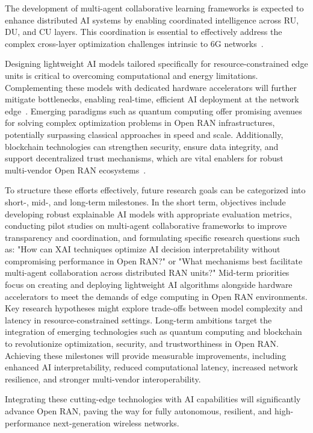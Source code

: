 \documentclass[sigconf]{acmart}
\begin{document}
The development of multi-agent collaborative learning frameworks is expected to enhance distributed AI systems by enabling coordinated intelligence across RU, DU, and CU layers. This coordination is essential to effectively address the complex cross-layer optimization challenges intrinsic to 6G networks~\cite{ref48}.

Designing lightweight AI models tailored specifically for resource-constrained edge units is critical to overcoming computational and energy limitations. Complementing these models with dedicated hardware accelerators will further mitigate bottlenecks, enabling real-time, efficient AI deployment at the network edge~\cite{ref50}. Emerging paradigms such as quantum computing offer promising avenues for solving complex optimization problems in Open RAN infrastructures, potentially surpassing classical approaches in speed and scale. Additionally, blockchain technologies can strengthen security, ensure data integrity, and support decentralized trust mechanisms, which are vital enablers for robust multi-vendor Open RAN ecosystems~\cite{ref54}. 

To structure these efforts effectively, future research goals can be categorized into short-, mid-, and long-term milestones. In the short term, objectives include developing robust explainable AI models with appropriate evaluation metrics, conducting pilot studies on multi-agent collaborative frameworks to improve transparency and coordination, and formulating specific research questions such as: "How can XAI techniques optimize AI decision interpretability without compromising performance in Open RAN?" or "What mechanisms best facilitate multi-agent collaboration across distributed RAN units?" Mid-term priorities focus on creating and deploying lightweight AI algorithms alongside hardware accelerators to meet the demands of edge computing in Open RAN environments. Key research hypotheses might explore trade-offs between model complexity and latency in resource-constrained settings. Long-term ambitions target the integration of emerging technologies such as quantum computing and blockchain to revolutionize optimization, security, and trustworthiness in Open RAN. Achieving these milestones will provide measurable improvements, including enhanced AI interpretability, reduced computational latency, increased network resilience, and stronger multi-vendor interoperability. 

Integrating these cutting-edge technologies with AI capabilities will significantly advance Open RAN, paving the way for fully autonomous, resilient, and high-performance next-generation wireless networks.
\end{document}
